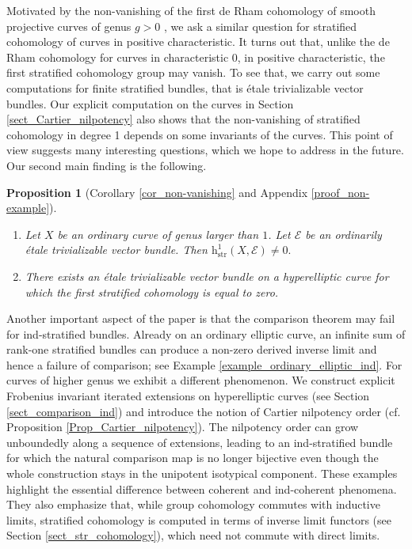 \documentclass[12pt,a4]{amsart}
\newtheorem{proposition}[theorem]{Proposition}
\theoremstyle{definition}
\begin{document}
Motivated by the non-vanishing of the first de Rham cohomology of smooth projective
curves of genus $g>0$ \cite{BHT25}, we ask a similar question for stratified cohomology
of curves in positive characteristic. It turns out that, unlike the de Rham cohomology for curves
in characteristic 0, in positive characteristic, the first stratified cohomology group may vanish.
To see that, we carry out some computations for finite stratified bundles, that is \'etale trivializable vector bundles. 
Our explicit computation on the curves in Section \ref{sect_Cartier_nilpotency}
also shows that the non-vanishing of stratified cohomology in degree 1 depends on some
invariants of the curves. This point of view suggests many interesting questions, which
we hope to address in the future. Our second main finding is the following.
\begin{proposition}[Corollary \ref{cor_non-vanishing} and Appendix \ref{proof_non-example}]
\begin{enumerate}
\item 
Let $X$ be an ordinary curve of genus larger than $1$. 
Let $\mathcal E$ be an ordinarily \'etale trivializable vector bundle. 
Then $\mathrm h^1_\mathrm{str}(X, \mathcal E) \neq 0.$
\item There exists an \'etale trivializable vector bundle on a hyperelliptic curve for which the 
first stratified cohomology is equal to zero. 
\end{enumerate}
\end{proposition}

Another important aspect of the paper is that the comparison theorem may fail for ind-stratified bundles. Already on an ordinary elliptic curve, an infinite sum of rank-one stratified bundles can produce a non-zero derived inverse limit and hence a failure of comparison; see Example \ref{example_ordinary_elliptic_ind}. For curves of higher genus we exhibit a different phenomenon. We construct explicit Frobenius invariant iterated extensions on hyperelliptic curves (see Section \ref{sect_comparison_ind}) and introduce the notion of Cartier nilpotency order (cf. Proposition \ref{Prop_Cartier_nilpotency}). The nilpotency order can grow unboundedly along a sequence of extensions, leading to an ind-stratified bundle for which the natural comparison map is no longer bijective even though the whole construction stays in the unipotent isotypical component. These examples highlight the essential difference between coherent and ind-coherent phenomena. They also emphasize that, while group cohomology commutes with inductive limits, stratified cohomology is computed in terms of inverse limit functors (see Section \ref{sect_str_cohomology}), which need not commute with direct limits. 
\end{document}
